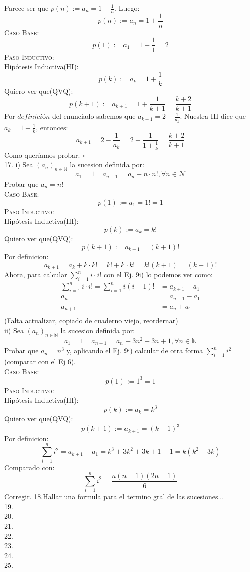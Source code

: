 \documentclass[a4paper,11pt]{article}
\begin{document}
Parece ser que $p(n) := a_n = 1 + \frac{1}{n}.$ Luego:
\[p(n) := a_n = 1 + \frac{1}{n} \]
\textsc{Caso Base}:\\
\[p(1):= a_1 = 1 + \frac{1}{1} = 2 \]
\textsc{Paso Inductivo}:\\
Hipótesis Inductiva(HI):\[p(k):= a_k = 1 + \frac{1}{k} \]
Quiero ver que(QVQ):\[p(k+1):= a_{k+1} = 1 + \frac{1}{k+1} = \frac{k+2}{k+1} \]
Por $\textit{definición}$ del enunciado sabemos que $a_{k+1} =  2 - \frac{1}{a_k}  $. Nuestra HI dice que $a_k =  1 + \frac{1}{k} $, entonces:\\
\[a_{k+1}= 2 - \frac{1}{a_k} = 2 - \frac{1}{1 + \frac{1}{k}} = \frac{k+2}{k+1} \]
Como queríamos probar.
\hfill$\square$\\
17. i) Sea $(a_n)_{n \in \mathbb{N}}$ la sucesion definida por:
\[a_1 = 1 \;\;\;\; a_{n+1}=a_n+n\cdot n!, \forall n \in \mathcal{N}\]
Probar que $a_n = n!$\\

\textsc{Caso Base}:\\
\[p(1):= a_1 = 1! = 1 \]
\textsc{Paso Inductivo}:\\
Hipótesis Inductiva(HI):\[p(k):= a_k = k!\]
Quiero ver que(QVQ):\[p(k+1):= a_{k+1} = (k+1)! \]
Por definicion:\[a_{k+1}=a_k+k \cdot k! = k! + k\cdot k! = k! (k+1) = (k+1)!\]
Ahora, para calcular $\sum\limits_{i=1}^{n} i \cdot i! $ con el Ej. 9i) lo podemos ver  como:
\begin{align*}
\sum\limits_{i=1}^{n} i \cdot i! = \sum\limits_{i=1}^{n} i (i-1)! & = a_{k+1} - a_1 \\
    a_n & = a_{n+1} - a_1 \\
    a_{n+1} & = a_n + a_1 \\
\end{align*}
(Falta actualizar, copiado de cuaderno viejo, reordernar)\\
ii) Sea $(a_n)_{n \in \mathbb{N}}$ la sucesion definida por:
\[a_1 = 1 \;\;\;\; a_{n+1} = a_n + 3n^2 + 3n + 1, \forall n \in \mathbb{N}\]
Probar que $a_n = n^3$ y, aplicando el Ej. 9i) calcular de otra forma $\sum\limits_{i=1}^n i^2$ (comparar con el Ej 6).\\
\textsc{Caso Base}:\\
\[p(1):= 1^3 = 1 \]
\textsc{Paso Inductivo}:\\
Hipótesis Inductiva(HI):\[p(k):= a_k = k^3\]
Quiero ver que(QVQ):\[p(k+1):= a_{k+1} = (k+1)^3 \]
Por definicion:\[\sum\limits_{i=1}^n i^2 =  a_{k+1} - a_1 = k^3 + 3k^2 + 3k + 1 - 1 = k(k^2 + 3k)\]
Comparado con:\\
\[\sum\limits_{i=1}^n i^2 = \frac{n(n+1)(2n+1)}{6}\]
Corregir.
18.Hallar una formula para el termino gral de las sucesiones...\\
19.\\
20.\\
21.\\
22.\\
23.\\
24.\\
25.\\
\end{document}
